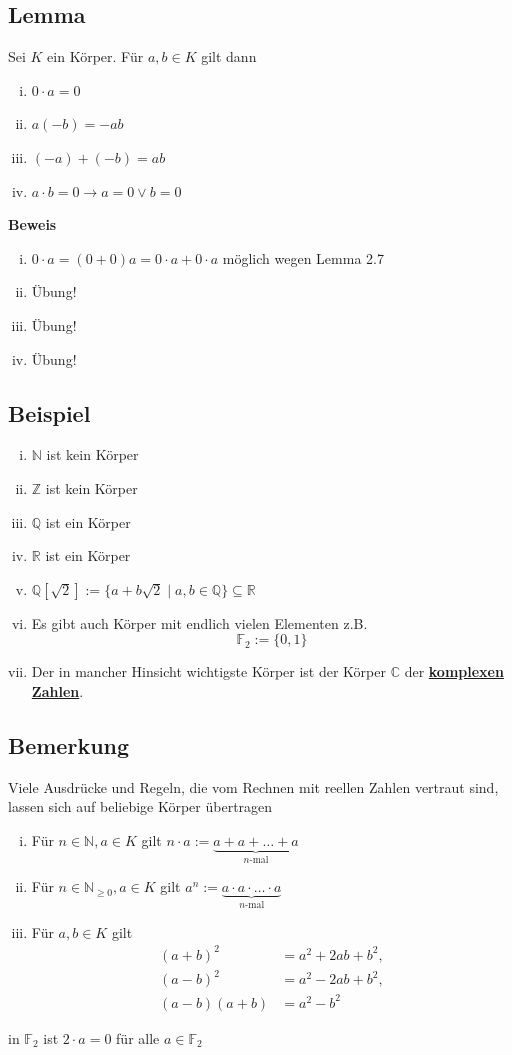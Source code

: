 \subsection{Lemma}
Sei \(K\) ein Körper. Für \( a,b \in K\) gilt dann 
\begin{enumerate}[i)]
\item \( 0 \cdot a = 0\)
\item \( a(-b)=-ab\)
\item \( (-a)+(-b)=ab\)
\item \( a \cdot b = 0 \longrightarrow a=0 \vee b=0\)
\end{enumerate}
\textbf{Beweis}
\begin{enumerate}[i)]
\item \( 0  \cdot a = (0+0)a= 0 \cdot a + 0 \cdot a \) \quad möglich wegen Lemma 2.7
\item Übung!
\item Übung!
\item Übung!
\end{enumerate}

\subsection{Beispiel}
\begin{enumerate}[i)]
\item \(\mathds{N}\) ist kein Körper
\item \(\mathds{Z}\) ist kein Körper
\item \(\mathds{Q}\) ist ein Körper
\item \(\mathds{R}\) ist ein Körper
\item \(\mathds{Q} [\sqrt{2}] := \{a+b\sqrt{2} \mid a,b \in \mathds{Q}\} \subseteq \mathds{R} \)
\item Es gibt auch Körper mit endlich vielen Elementen z.B.
\[
\mathds{F}_2 := \{0,1\} 
\]
\item Der in mancher Hinsicht wichtigste Körper ist der Körper $\mathds{C}$ der \underline{\textbf{komplexen Zahlen}}.
\end{enumerate}

\subsection{Bemerkung}
Viele Ausdrücke und Regeln, die vom Rechnen mit reellen Zahlen vertraut sind, lassen sich auf beliebige Körper übertragen
\begin{enumerate}[i)]
\item Für $n \in \mathds{N}, a \in K$ gilt $n \cdot a := \underbrace{a+a+\ldots +a}_{n\text{-mal}}$
\item Für $n \in \mathds{N}_{\geq0}, a \in K$ gilt $a^n := \underbrace{a \cdot a \cdot \ldots \cdot a}_{n\text{-mal}}$
\item Für $ a,b \in K$ gilt 
\begin{align*}
 (a+b)^2 &= a^2 + 2ab + b^2, \\
(a-b)^2 &= a^2 -2ab +b^2, \\
(a-b)(a+b) &= a^2 - b^2 
\end{align*}
\end{enumerate}
\framebox [1 cm]{{\Huge !}} in $\mathds{F}_2$ ist $ 2\cdot a = 0$ für alle $a \in \mathds{F}_2 $

